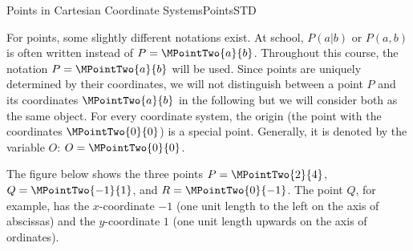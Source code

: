 \begin{MXContent}{Points in Cartesian Coordinate Systems}{Points}{STD}
\begin{MInfo}
\begin{center}
{
}
\end{center}

\end{MInfo}

For points, some slightly different notations exist. At school, $P(a|b)$ or $P(a,b)$ is often written instead of $P=\MPointTwo{a}{b}$. Throughout this course, the notation $P=\MPointTwo{a}{b}$
will be used. Since points are uniquely determined by their coordinates, we will not distinguish between a point $P$ 
and its coordinates $\MPointTwo{a}{b}$ in the following but we will consider both as the same object. 
For every coordinate system, the origin (the point with the coordinates $\MPointTwo{0}{0}$) is a special point. Generally,
it is denoted by the variable $O$: $O=\MPointTwo{0}{0}$.

\begin{MExample}
The figure below shows the three points $P=\MPointTwo{2}{4}$, $Q=\MPointTwo{-1}{1}$, and $R=\MPointTwo{0}{-1}$.
The point $Q$, for example, has the $x$-coordinate $-1$ (one unit length to the left on the axis of abscissas)
and the $y$-coordinate $1$ (one unit length upwards on the axis of ordinates).
\begin{center}
\end{center}


\end{MExample}
\end{MXContent}
